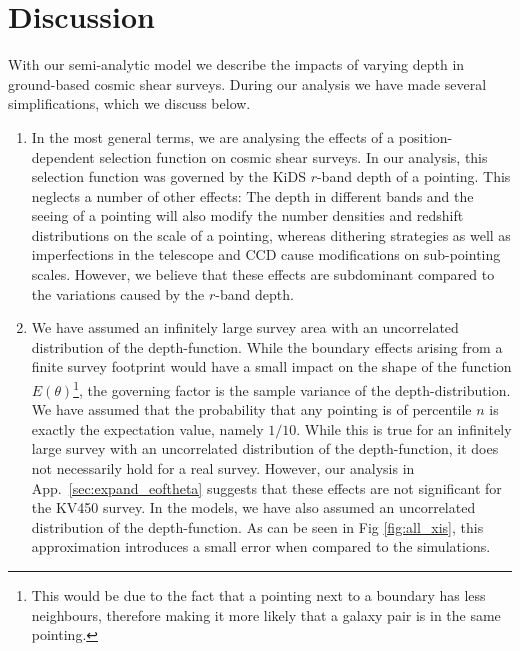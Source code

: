 \documentclass[referee]{aa} %
\renewcommand{\[}{\begin{equation}}
\renewcommand{\]}{\end{equation}}
\begin{document}

\section{Discussion}
\label{sec:discussion}
With our semi-analytic model we describe the impacts of varying depth in ground-based cosmic shear surveys. During our analysis we have made several simplifications, which we discuss below.
\begin{enumerate}
\item In the most general terms, we are analysing the effects of a position-dependent selection function on cosmic shear surveys. In our analysis, this selection function was governed by the KiDS $r$-band depth of a pointing. This neglects a number of other effects: The depth in different bands and the seeing of a pointing will also modify the number densities and redshift distributions on the scale of a pointing, whereas dithering strategies as well as imperfections in the telescope and CCD cause modifications on sub-pointing scales. However, we believe that these effects are subdominant compared to the variations caused by the $r$-band depth.

\item We have assumed an infinitely large survey area with an uncorrelated distribution of the depth-function. While the boundary effects arising from a finite survey footprint would have a small impact on the shape of the function $E(\theta)$\footnote{This would be due to the fact that a pointing next to a boundary has less neighbours, therefore making it more likely that a galaxy pair is in the same pointing.}, the governing factor is the sample variance of the depth-distribution. We have assumed that the probability that any pointing is of percentile $n$ is exactly the expectation value, namely $1/10$. While this is true for an infinitely large survey with an uncorrelated distribution of the depth-function, it does not necessarily hold for a real survey. However, our analysis in App.~\ref{sec:expand_eoftheta} suggests that these effects are not significant for the KV450 survey. In the models, we have also assumed an uncorrelated distribution of the depth-function. As can be seen in Fig \ref{fig:all_xis}, this approximation introduces a small error when compared to the simulations.


\end{enumerate}
\end{document}
